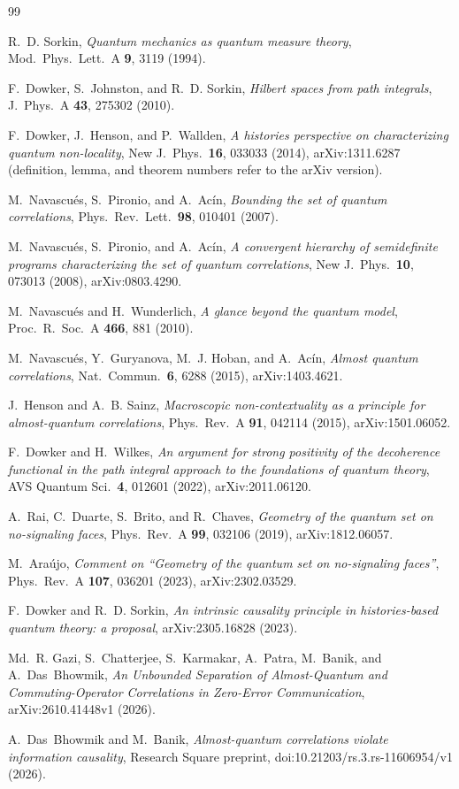 \documentclass[11pt,a4paper]{article}
\theoremstyle{definition}
\theoremstyle{remark}
\begin{document}
\begin{thebibliography}{99}

R.~D. Sorkin, \emph{Quantum mechanics as quantum measure theory}, Mod.\ Phys.\ Lett.\ A \textbf{9}, 3119 (1994).

F.~Dowker, S.~Johnston, and R.~D. Sorkin, \emph{Hilbert spaces from path integrals}, J.\ Phys.\ A \textbf{43}, 275302 (2010).

F.~Dowker, J.~Henson, and P.~Wallden, \emph{A histories perspective on characterizing quantum non-locality}, New J.\ Phys.\ \textbf{16}, 033033 (2014), arXiv:1311.6287 (definition, lemma, and theorem numbers refer to the arXiv version).

M.~Navascu\'es, S.~Pironio, and A.~Ac\'in, \emph{Bounding the set of quantum correlations}, Phys.\ Rev.\ Lett.\ \textbf{98}, 010401 (2007).

M.~Navascu\'es, S.~Pironio, and A.~Ac\'in, \emph{A convergent hierarchy of semidefinite programs characterizing the set of quantum correlations}, New J.\ Phys.\ \textbf{10}, 073013 (2008), arXiv:0803.4290.

M.~Navascu\'es and H.~Wunderlich, \emph{A glance beyond the quantum model}, Proc.\ R.\ Soc.\ A \textbf{466}, 881 (2010).

M.~Navascu\'es, Y.~Guryanova, M.~J. Hoban, and A.~Ac\'in, \emph{Almost quantum correlations}, Nat.\ Commun.\ \textbf{6}, 6288 (2015), arXiv:1403.4621.

J.~Henson and A.~B. Sainz, \emph{Macroscopic non-contextuality as a principle for almost-quantum correlations}, Phys.\ Rev.\ A \textbf{91}, 042114 (2015), arXiv:1501.06052.

F.~Dowker and H.~Wilkes, \emph{An argument for strong positivity of the decoherence functional in the path integral approach to the foundations of quantum theory}, AVS Quantum Sci.\ \textbf{4}, 012601 (2022), arXiv:2011.06120.

A.~Rai, C.~Duarte, S.~Brito, and R.~Chaves, \emph{Geometry of the quantum set on no-signaling faces}, Phys.\ Rev.\ A \textbf{99}, 032106 (2019), arXiv:1812.06057.

M.~Ara\'ujo, \emph{Comment on ``Geometry of the quantum set on no-signaling faces''}, Phys.\ Rev.\ A \textbf{107}, 036201 (2023), arXiv:2302.03529.

F.~Dowker and R.~D. Sorkin, \emph{An intrinsic causality principle in histories-based quantum theory: a proposal}, arXiv:2305.16828 (2023).

Md.~R. Gazi, S.~Chatterjee, S.~Karmakar, A.~Patra, M.~Banik, and A.~Das~Bhowmik, \emph{An Unbounded Separation of Almost-Quantum and Commuting-Operator Correlations in Zero-Error Communication}, arXiv:2610.41448v1 (2026).

A.~Das~Bhowmik and M.~Banik, \emph{Almost-quantum correlations violate information causality}, Research Square preprint, doi:10.21203/rs.3.rs-11606954/v1 (2026).

\end{thebibliography}
\end{document}
